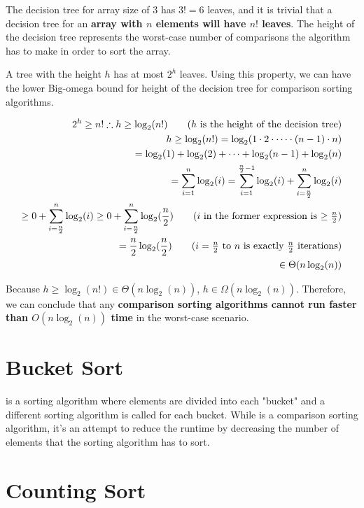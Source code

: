 \documentclass{report}
\begin{document}
The decision tree for array size of 3 has $3! = 6$ leaves, and it is trivial that a decision tree for an \textbf{array with $n$ elements will have $n!$ leaves}. The height of the decision tree represents the worst-case number of comparisons the algorithm has to make in order to sort the array.

A tree with the height $h$ has at most $2^{h}$ leaves. Using this property, we can have the lower Big-omega bound for height of the decision tree for comparison sorting algorithms.

\begin{align*}
  2^{h} \geq n! \therefore h \geq \log_{2}(n!) \tag{$h$ is the height of the decision tree} \\
  h \geq \log_{2}(n!) = \log_{2}(1 \cdot 2 \cdot \cdots \cdot (n - 1) \cdot n) \\
  = \log_{2}(1) + \log_{2}(2) + \cdots + \log_{2}(n - 1) + \log_{2}(n) \\
  = \sum_{i = 1}^{n} \log_{2}(i) = \sum_{i = 1}^{\frac{n}{2} - 1} \log_{2}(i) + \sum_{i = \frac{n}{2}}^{n} \log_{2}(i) \\
  \geq 0 + \sum_{i = \frac{n}{2}}^{n} \log_{2}(i) \geq 0 + \sum_{i = \frac{n}{2}}^{n} \log_{2}(\frac{n}{2}) \tag{$i$ in the former expression is $\geq \frac{n}{2}$} \\
  = \frac{n}{2} \log_{2}(\frac{n}{2}) \tag{$i = \frac{n}{2}$ to $n$ is exactly $\frac{n}{2}$ iterations} \\
  \in \Theta(n \log_{2}(n))
\end{align*}

Because $h \geq \log_{2}(n!) \in \Theta(n \log_{2}(n))$, $h \in \Omega(n \log_{2}(n))$. Therefore, we can conclude that any \textbf{comparison sorting algorithms cannot run faster than $O(n \log_{2}(n))$ time} in the worst-case scenario.

\section{Bucket Sort}

 is a sorting algorithm where elements are divided into each "bucket" and a different sorting algorithm is called for each bucket. While  is a comparison sorting algorithm, it's an attempt to reduce the runtime by decreasing the number of elements that the sorting algorithm has to sort.

\section{Counting Sort}
\end{document}
